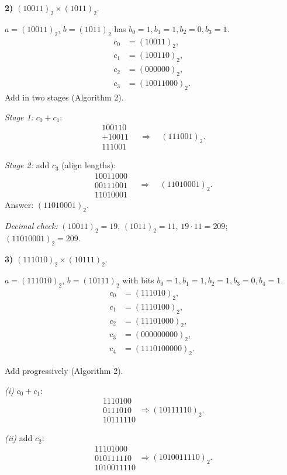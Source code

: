 \documentclass[12pt]{article}
\begin{document}
\textbf{2) } $(10011)_2 \times (1011)_2$.

$a=(10011)_2$, $b=(1011)_2$ has $b_0=1,b_1=1,b_2=0,b_3=1$.
\[
\begin{aligned}
c_0&=(10011)_2,\\
c_1&=(100110)_2,\\
c_2&=(000000)_2,\\
c_3&=(10011000)_2.
\end{aligned}
\]
Add in two stages (Algorithm 2).

\emph{Stage 1: } $c_0+c_1$:
\[
\begin{array}{r}
100110\\
+10011\\ \hline
111001
\end{array}
\quad\Rightarrow\quad (111001)_2.
\]

\emph{Stage 2: } add $c_3$ (align lengths):
\[
\begin{array}{r}
10011000\\
00111001\\ \hline
11010001
\end{array}
\quad\Rightarrow\quad (11010001)_2.
\]
Answer: $(11010001)_2$.

\emph{Decimal check:} $(10011)_2=19$, $(1011)_2=11$, $19\cdot 11=209$; $(11010001)_2=209$.

\bigskip

\textbf{3) } $(111010)_2 \times (10111)_2$.

$a=(111010)_2$, $b=(10111)_2$ with bits $b_0=1,b_1=1,b_2=1,b_3=0,b_4=1$.
\[
\begin{aligned}
c_0&=(111010)_2,\\
c_1&=(1110100)_2,\\
c_2&=(11101000)_2,\\
c_3&=(000000000)_2,\\
c_4&=(1110100000)_2.
\end{aligned}
\]

Add progressively (Algorithm 2).

\emph{(i) } $c_0+c_1$:
\[
\begin{array}{r}
1110100\\
0111010\\ \hline
10111110
\end{array}
\Rightarrow (10111110)_2.
\]

\emph{(ii) } add $c_2$:
\[
\begin{array}{r}
11101000\\
010111110\\ \hline
1010011110
\end{array}
\Rightarrow (1010011110)_2.
\]
\end{document}
